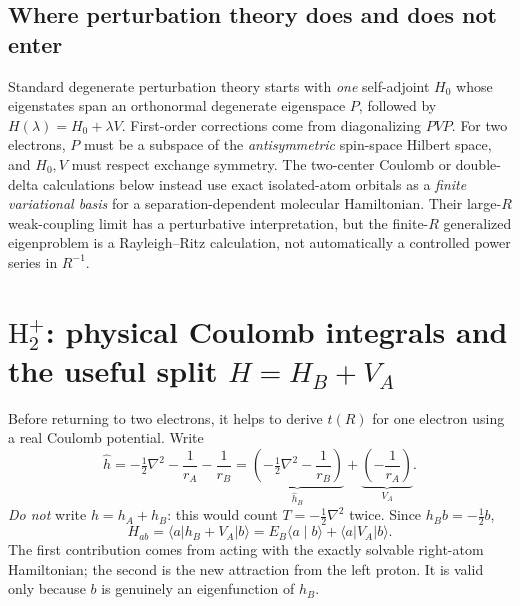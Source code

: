 \documentclass[11pt,letterpaper]{article}
\newcommand{\braket}[2]{\langle #1\mid #2\rangle}
\newcommand{\mel}[3]{\langle #1\lvert #2\rvert #3\rangle}
\begin{document}
\subsection{Where perturbation theory does and does not enter}
Standard degenerate perturbation theory starts with \emph{one} self-adjoint $H_0$ whose eigenstates span an orthonormal degenerate eigenspace $P$, followed by $H(\lambda)=H_0+\lambda V$. First-order corrections come from diagonalizing $PVP$. For two electrons, $P$ must be a subspace of the \emph{antisymmetric} spin-space Hilbert space, and $H_0,V$ must respect exchange symmetry. The two-center Coulomb or double-delta calculations below instead use exact isolated-atom orbitals as a \emph{finite variational basis} for a separation-dependent molecular Hamiltonian. Their large-$R$ weak-coupling limit has a perturbative interpretation, but the finite-$R$ generalized eigenproblem is a Rayleigh--Ritz calculation, not automatically a controlled power series in $R^{-1}$.

\section{$\mathrm H_2^+$: physical Coulomb integrals and the useful split $H=H_B+V_A$}
Before returning to two electrons, it helps to derive $t(R)$ for one electron using a real Coulomb potential. Write
\begin{equation}\label{eq:h2plus-split}
\hat h=-\tfrac12\nabla^2-\frac1{r_A}-\frac1{r_B}
=\underbrace{\left(-\tfrac12\nabla^2-\frac1{r_B}\right)}_{\hat h_B}+\underbrace{\left(-\frac1{r_A}\right)}_{V_A}.
\end{equation}
\emph{Do not} write $h=h_A+h_B$: this would count $T=-\frac12\nabla^2$ twice. Since $h_Bb=-\frac12b$,
\begin{equation}\label{eq:habsplit}
\boxed{H_{ab}=\mel a{h_B+V_A}b=E_B\braket a b+\mel a{V_A}b.}
\end{equation}
The first contribution comes from acting with the exactly solvable right-atom Hamiltonian; the second is the new attraction from the left proton. It is valid only because $b$ is genuinely an eigenfunction of $h_B$.
\end{document}
